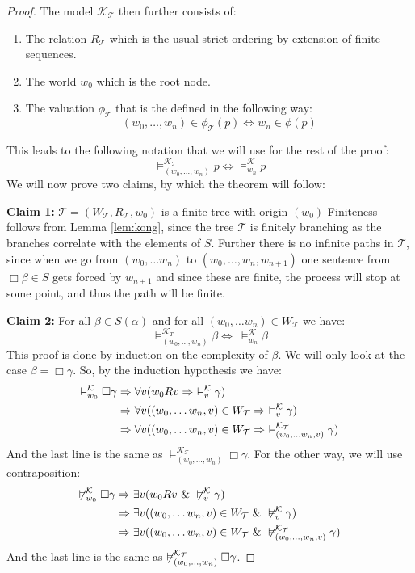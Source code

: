 \documentclass[../main.tex]{subfiles}
\begin{document}
\begin{proof}
	The model $\mathcal{K}_{\mathcal{T}}$ then further consists of:
	\begin{enumerate}
		\item The relation $R_{\mathcal{T}}$ which is the usual strict
	ordering by extension of finite sequences. 
		\item	The world $w_0$ which is the root node.
		\item The valuation $\phi_{\mathcal{T}}$ that is the defined in
		the following way:
		\[(w_0,\ldots,w_n)\in \phi_{\mathcal{T}}(p)\Leftrightarrow w_n\in\phi(p)\]
	\end{enumerate}
	This leads to the following notation that we will use for the rest
	of the proof:
	\[\vDash_{(w_0,\ldots,w_n)}^{\mathcal{K}_{\mathcal{T}}}p\Leftrightarrow\vDash_{w_n}^\mathcal{K}
	p\]
	We will now prove two claims, by which the theorem will follow:

	\textbf{Claim 1:} $\mathcal{T}=(W_{\mathcal{T}},R_{\mathcal{T}},w_0)$ is a finite tree with origin $(w_0)$
	Finiteness follows from Lemma \ref{lem:kong}, since the tree $\mathcal{T}$
	is finitely branching as the branches correlate with the elements
	of $S$. Further there is no infinite paths in $\mathcal{T}$, since when
	we go from $(w_0,\ldots w_n)$ to $(w_0,\ldots, w_n,w_{n+1})$ one
	sentence from $\Box\beta\in S$ gets forced by $w_{n+1 }$ and since
	these are finite, the process will stop at some point, and thus the
	path will be finite.

	\textbf{Claim 2:} For all $\beta\in S(\alpha)$ and for all $(w_0,\ldots
	w_n)\in W_{\mathcal{T}}$ we have:
	$$\vDash^{\mathcal{K}_T}_{(w_0,\ldots,w_n)}\beta\Leftrightarrow\ \vDash_{w_n}^\mathcal{K}\beta$$
	This proof is done by induction on the complexity of $\beta$. We will
	only look at the case $\beta=\Box\gamma$. So, by the induction
	hypothesis we have:
	\begin{align*}
		\vDash^{\mathcal{K}}_{w_0}\Box\gamma&\Rightarrow\forall v(w_0Rv\Rightarrow\ 
		\vDash^{\mathcal{K}}_v\gamma)\\
				      &\Rightarrow\forall v((w_0,\ldots
				      w_n,v)\in W_\T\Rightarrow\
				      \vDash^{\mathcal{K}}_v\gamma)\\
				      &\Rightarrow\forall v((w_0,\ldots
				      w_n,v)\in W_{\mathcal{T}}\Rightarrow\
				      \vDash_{(w_0,\ldots
				      w_n,v)}^{\mathcal{K}_\mathcal{T}}\gamma)
	\end{align*}
	And the last line is the same as $\vDash^{\mathcal{K}_\mathcal{T}}_{(w_0,\ldots,w_n)}\Box\gamma$.
	For the other way, we will use contraposition:
	\begin{align*}
		\not\vDash^{\mathcal{K}}_{w_0}\Box\gamma&\Rightarrow \exists v(w_0Rv\ \&\
		\not\vDash^{\mathcal{K}}_v\gamma)\\
					  &\Rightarrow\exists v((w_0,\ldots
					  w_n,v)\in W_{\mathcal{T}}\ \&\
					  \not\vDash^{\mathcal{K}}_v\gamma)\\
					  &\Rightarrow\exists v((w_0,\ldots
					  w_n,v)\in W_{\mathcal{T}}\ \&\
					  \not\vDash_{(w_0,\ldots,w_n,v)}^{\mathcal{K}_\mathcal{T}}\gamma)
	\end{align*}
	And the last line is the same as
	$\not\vDash^{\mathcal{K}_{\mathcal{T}}}_{(w_0,\ldots,w_n)}\Box\gamma$. 


\end{proof}
\end{document}
